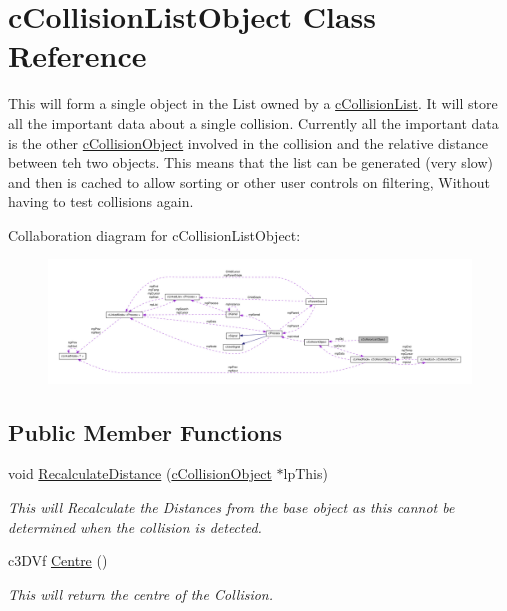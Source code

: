 \hypertarget{classc_collision_list_object}{
\section{cCollisionListObject Class Reference}
\label{classc_collision_list_object}
}


This will form a single object in the List owned by a \hyperlink{classc_collision_list}{cCollisionList}. It will store all the important data about a single collision. Currently all the important data is the other \hyperlink{classc_collision_object}{cCollisionObject} involved in the collision and the relative distance between teh two objects. This means that the list can be generated (very slow) and then is cached to allow sorting or other user controls on filtering, Without having to test collisions again.  




Collaboration diagram for cCollisionListObject:\nopagebreak
\begin{figure}[H]
\begin{center}
\leavevmode
\includegraphics[width=400pt]{classc_collision_list_object__coll__graph}
\end{center}
\end{figure}
\subsection*{Public Member Functions}
\begin{DoxyCompactItemize}
\item 
\hypertarget{classc_collision_list_object_a523f156c7f21b71a0385289215673d03}{
void \hyperlink{classc_collision_list_object_a523f156c7f21b71a0385289215673d03}{RecalculateDistance} (\hyperlink{classc_collision_object}{cCollisionObject} $\ast$lpThis)}
\label{classc_collision_list_object_a523f156c7f21b71a0385289215673d03}

\begin{DoxyCompactList}\small\item\em This will Recalculate the Distances from the base object as this cannot be determined when the collision is detected. \end{DoxyCompactList}\item 
\hypertarget{classc_collision_list_object_a760a3e6b5627e5afe233291bda0e8909}{
c3DVf \hyperlink{classc_collision_list_object_a760a3e6b5627e5afe233291bda0e8909}{Centre} ()}
\label{classc_collision_list_object_a760a3e6b5627e5afe233291bda0e8909}

\begin{DoxyCompactList}\small\item\em This will return the centre of the Collision. \end{DoxyCompactList}\end{DoxyCompactItemize}


